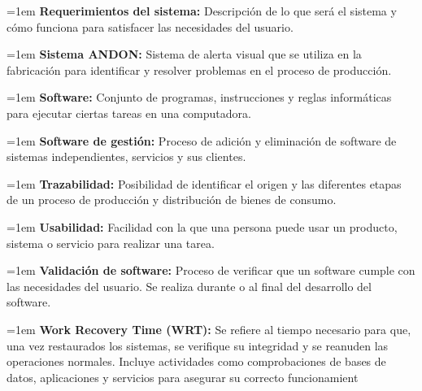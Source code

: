 \documentclass[12pt,letterpaper,spanish, xcolor=table]{report}
\numberwithin{figure}{subsection}
\begin{document}
	
	{\leftskip=1em 
		\noindent 
		\textbf{Requerimientos del sistema:} Descripción de lo que será el sistema y cómo funciona para satisfacer las necesidades del usuario.\\
	\par}
	
	
	{\leftskip=1em 
		\noindent 
		\textbf{Sistema ANDON:} Sistema de alerta visual que se utiliza en la fabricación para identificar y resolver problemas en el proceso de producción. \\
	\par}
	
	
	{\leftskip=1em 
		\noindent 
		\textbf{Software:} Conjunto de programas, instrucciones y reglas informáticas para ejecutar ciertas tareas en una computadora.\\
	\par}
	
	
	{\leftskip=1em 
		\noindent 
		\textbf{Software de gestión:} Proceso de adición y eliminación de software de sistemas independientes, servicios y sus clientes.\\
	\par}
	
	
	{\leftskip=1em 
		\noindent 
		\textbf{Trazabilidad:} Posibilidad de identificar el origen y las diferentes etapas de un proceso de producción y distribución de bienes de consumo. \\
	\par}
	
	
	{\leftskip=1em 
		\noindent 
		\textbf{Usabilidad:} Facilidad con la que una persona puede usar un producto, sistema o servicio para realizar una tarea.\\
	\par}
	
	
	{\leftskip=1em 
		\noindent 
		\textbf{Validación de software:} Proceso de verificar que un software cumple con las necesidades del usuario. Se realiza durante o al final del desarrollo del software. \\
	\par}
	
	{\leftskip=1em 
		\noindent 
		\textbf{Work Recovery Time (WRT):} Se refiere al tiempo necesario para que, una vez restaurados los sistemas, se verifique su integridad y se reanuden las operaciones normales. Incluye actividades como comprobaciones de bases de datos, aplicaciones y servicios para asegurar su correcto funcionamient \\
	\par}
\end{document}
